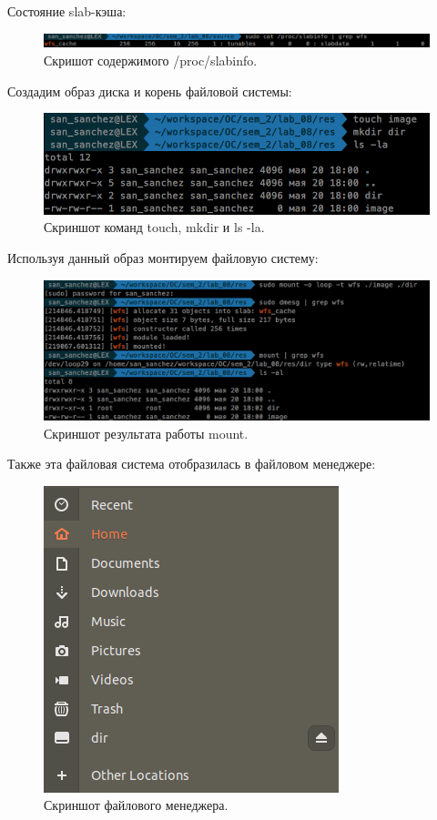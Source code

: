 Состояние slab-кэша:
\begin{figure}[H]
    \centering
    \includegraphics[scale=0.37]{data/image/5.png}
    \caption{Скришот содержимого /proc/slabinfo.}
\end{figure}

Создадим образ диска и корень файловой системы:
\begin{figure}[H]
    \centering
    \includegraphics[scale=0.37]{data/image/6.png}
    \caption{Скриншот команд touch, mkdir и ls -la.}
\end{figure}

Используя данный образ монтируем файловую систему:
\begin{figure}[H]
    \centering
    \includegraphics[scale=0.37]{data/image/7.png}
    \caption{Скриншот результата работы mount.}
\end{figure}

Также эта файловая система отобразилась в файловом менеджере:
\begin{figure}[H]
    \centering
    \includegraphics[scale=0.37]{data/image/8.png}
    \caption{Скриншот файлового менеджера.}
\end{figure}

